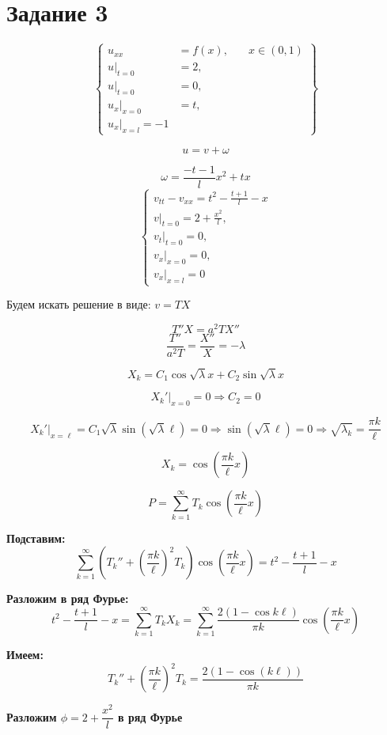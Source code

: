 \documentclass[a4paper,12pt]{article}
\begin{document}
\section*{Задание 3}
$$\left\{
\begin{aligned}
  u_{xx} &= f(x), \quad &x \in (0,1) \\
  u|_{t=0} &= 2, \\
  u|_{t=0} &= 0, \\
  u_x|_{x=0} &= t, \\
  u_x|_{x = l} = -1
\end{aligned}
\right\}$$

$$u = v + \omega$$

$$\omega = \frac{-t-1}{l}x^2 + tx$$
$$
\begin{cases}
v_{tt} - v_{xx} = t^2 - \frac{t+1}{l} - x \\
v|_{t=0} = 2 + \frac{x^2}{l}, \\
v_t|_{t=0} = 0, \\
v_x|_{x=0} = 0, \\
v_x|_{x=l} = 0
\end{cases}
$$

Будем искать решение в виде: $v = TX$

$$T'' X = a^2 T X'' $$
$$\frac{T''}{a^2 T} = \frac{X''}{X} = -\lambda$$

$$X_k = C_1 \cos\sqrt{\lambda}x + C_2 \sin\sqrt{\lambda}x$$

$$X_k'|_{x = 0} = 0 \Rightarrow C_2 = 0$$

$$X_k'|_{x = \ell} = C_1 \sqrt{\lambda} \sin(\sqrt{\lambda} \ell) = 0 \Rightarrow \sin(\sqrt{\lambda} \ell) = 0 \Rightarrow \sqrt{\lambda_k} = \frac{\pi k}{\ell}$$

$$X_k = \cos\left( \frac{\pi k}{\ell} x \right)$$

$$P = \sum_{k=1}^{\infty} T_k \cos\left( \frac{\pi k}{\ell} x \right)$$

\textbf{Подставим:}
$$\sum_{k=1}^{\infty} \left( T_k'' + \left( \frac{\pi k}{\ell} \right)^2 T_k \right) \cos\left( \frac{\pi k}{\ell} x \right) = t^2 - \frac{t+1}{l} - x$$

\textbf{Разложим в ряд Фурье:}
$$t^2 - \frac{t+1}{l} - x = \sum_{k=1}^{\infty} T_k X_k = \sum_{k=1}^{\infty} \frac{2(1 - \cos k \ell)}{\pi k} \cos\left( \frac{\pi k}{\ell} x \right)$$

\textbf{Имеем:}
$$T_k'' + \left( \frac{\pi k}{\ell} \right)^2 T_k = \frac{2(1 - \cos(k \ell))}{\pi k}$$

\textbf{Разложим $\phi = 2 + \dfrac{x^2}{l}$ в ряд Фурье}
\end{document}
